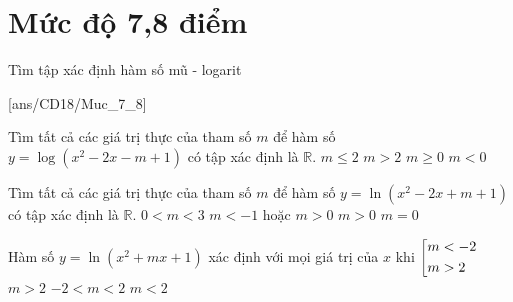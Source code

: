 \section{Mức độ 7,8 điểm}
\setcounter{ex}{0}
\setcounter{dang}{0}
\begin{dang}
    {Tìm tập xác định hàm số mũ - logarit}
\end{dang}
[ans/CD18/Muc_7_8]
\begin{ex}%
    [Mã 105 2017]
    Tìm tất cả các giá trị thực của tham số $m$ để hàm số $y=\log\left(x^2-2x-m+1\right)$ có tập xác định là $\mathbb{R}$.
    \choice
    {$m\le 2$}
    {$m>2$}
    {$m\ge 0$}
    {\True $m<0$}
\end{ex}

\begin{ex}%
    [Mã 104 2017]
    Tìm tất cả các giá trị thực của tham số $m$ để hàm số $y=\ln \left(x^2-2x+m+1\right)$ có tập xác định là $\mathbb{R}$.
    \choice
    {$0<m<3$}
    {$m<-1$ hoặc $m>0$}
    {\True $m>0$}
    {$m=0$}
\end{ex}

\begin{ex}%
    Hàm số $y=\ln \left(x^2+mx+1\right)$ xác định với mọi giá trị của $x$ khi
    \choice
    {$\left[\begin{aligned}& m<-2\\& m>2\end{aligned}\right.$}
    {$m>2$}
    {\True $-2<m<2$}
    {$m<2$}
\end{ex}

